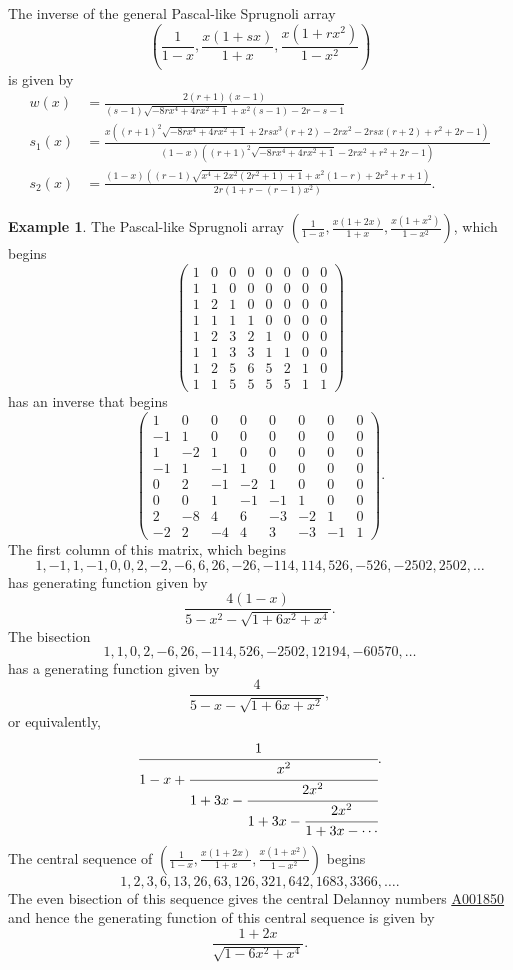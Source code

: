 \documentclass[12pt,reqno]{article}
\theoremstyle{definition}
\newtheorem{example}[theorem]{Example}
\newcommand{\seqnum}[1]{\href{http://oeis.org/#1}{\underline{#1}}}
\begin{document}
The inverse of the general Pascal-like Sprugnoli array 
$$\left(\frac{1}{1-x}, \frac{x(1+sx)}{1+x}, \frac{x(1+rx^2)}{1-x^2}\right)$$ is given by 
\begin{align*}
w(x)&=\frac{2(r+1)(x-1)}{(s-1) \sqrt{-8rx^4+4rx^2+1}+x^2(s-1)-2r-s-1}\\
s_1(x)&=\frac{x((r+1)^2 \sqrt{-8rx^4+4rx^2+1}+2rsx^3(r+2)-2rx^2-2rsx(r+2)+r^2+2r-1)}{(1-x)((r+1)^2 \sqrt{-8rx^4+4rx^2+1}-2rx^2+r^2+2r-1)}\\
s_2(x)&=\frac{(1-x)((r-1)\sqrt{x^4+2x^2(2r^2+1)+1}+x^2(1-r)+2r^2+r+1)}{2r(1+r-(r-1)x^2)}.\end{align*}
\begin{example}
The Pascal-like Sprugnoli array $\left(\frac{1}{1-x}, \frac{x(1+2x)}{1+x}, \frac{x(1+x^2)}{1-x^2}\right)$, which begins 
\[
\begin{pmatrix}
1 & 0 & 0 & 0 & 0 & 0 & 0 & 0 \\
1 & 1 & 0 & 0 & 0 & 0 & 0 & 0 \\
1 & 2 & 1 & 0 & 0 & 0 & 0 & 0 \\
1 & 1 & 1 & 1 & 0 & 0 & 0 & 0 \\
1 & 2 & 3 & 2 & 1 & 0 & 0 & 0 \\
1 & 1 & 3 & 3 & 1 & 1 & 0 & 0 \\
1 & 2 & 5 & 6 & 5 & 2 & 1 & 0 \\
1 & 1 & 5 & 5 & 5 & 5 & 1 & 1
\end{pmatrix}
\] 
has an inverse that begins 
\[
\begin{pmatrix}
1 & 0 & 0 & 0 & 0 & 0 & 0 & 0 \\
-1 & 1 & 0 & 0 & 0 & 0 & 0 & 0 \\
1 & -2 & 1 & 0 & 0 & 0 & 0 & 0 \\
-1 & 1 & -1 & 1 & 0 & 0 & 0 & 0 \\
0 & 2 & -1 & -2 & 1 & 0 & 0 & 0 \\
0 & 0 & 1 & -1 & -1 & 1 & 0 & 0 \\
2 & -8 & 4 & 6 & -3 & -2 & 1 & 0 \\
-2 & 2 & -4 & 4 & 3 & -3 & -1 & 1
\end{pmatrix}.
\]
The first column of this matrix, which begins
$$1, -1, 1, -1, 0, 0, 2, -2, -6, 6, 26, -26, -114, 114, 526, -526, -2502, 2502,\ldots$$ 
has generating function given by 
$$\frac{4(1-x)}{5-x^2-\sqrt{1+6x^2+x^4}}.$$ 
The bisection 
$$1, 1, 0, 2, -6, 26, -114, 526, -2502, 12194, -60570,\ldots$$ has a generating function given by 
$$\frac{4}{5-x-\sqrt{1+6x+x^2}},$$ or equivalently,
$$\cfrac{1}{1-x+\cfrac{x^2}{1+3x-\cfrac{2x^2}{1+3x-\cfrac{2x^2}{1+3x-\cdots}}}}.$$
The central sequence of $\left(\frac{1}{1-x}, \frac{x(1+2x)}{1+x}, \frac{x(1+x^2)}{1-x^2}\right)$ begins 
$$1, 2, 3, 6, 13, 26, 63, 126, 321, 642, 1683, 3366,\ldots.$$ The even bisection of this sequence gives the central Delannoy numbers \seqnum{A001850} and hence the generating function of this central sequence is given by
$$\frac{1+2x}{\sqrt{1-6x^2+x^4}}.$$
\end{example}
\end{document}
